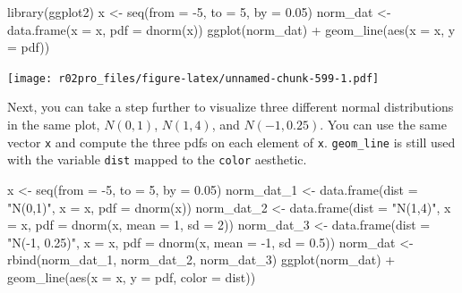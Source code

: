 \documentclass[
]{book}
\newenvironment{Shaded}{\begin{snugshade}}{\end{snugshade}}
\newcommand{\AttributeTok}[1]{\textcolor[rgb]{0.77,0.63,0.00}{#1}}
\newcommand{\DecValTok}[1]{\textcolor[rgb]{0.00,0.00,0.81}{#1}}
\newcommand{\FloatTok}[1]{\textcolor[rgb]{0.00,0.00,0.81}{#1}}
\newcommand{\FunctionTok}[1]{\textcolor[rgb]{0.00,0.00,0.00}{#1}}
\newcommand{\NormalTok}[1]{#1}
\newcommand{\OtherTok}[1]{\textcolor[rgb]{0.56,0.35,0.01}{#1}}
\newcommand{\SpecialCharTok}[1]{\textcolor[rgb]{0.00,0.00,0.00}{#1}}
\newcommand{\StringTok}[1]{\textcolor[rgb]{0.31,0.60,0.02}{#1}}
\begin{document}
\begin{Shaded}
\begin{Highlighting}[]
\FunctionTok{library}\NormalTok{(ggplot2)}
\NormalTok{x }\OtherTok{\textless{}{-}} \FunctionTok{seq}\NormalTok{(}\AttributeTok{from =} \SpecialCharTok{{-}}\DecValTok{5}\NormalTok{, }\AttributeTok{to =} \DecValTok{5}\NormalTok{, }\AttributeTok{by =} \FloatTok{0.05}\NormalTok{)}
\NormalTok{norm\_dat }\OtherTok{\textless{}{-}} \FunctionTok{data.frame}\NormalTok{(}\AttributeTok{x =}\NormalTok{ x, }\AttributeTok{pdf =} \FunctionTok{dnorm}\NormalTok{(x))}
\FunctionTok{ggplot}\NormalTok{(norm\_dat) }\SpecialCharTok{+} \FunctionTok{geom\_line}\NormalTok{(}\FunctionTok{aes}\NormalTok{(}\AttributeTok{x =}\NormalTok{ x, }\AttributeTok{y =}\NormalTok{ pdf))}
\end{Highlighting}
\end{Shaded}

\texttt{[image: r02pro\_files/figure-latex/unnamed-chunk-599-1.pdf]}

Next, you can take a step further to visualize three different normal distributions in the same plot, \(N(0,1)\), \(N(1,4)\), and \(N(-1, 0.25)\). You can use the same vector \texttt{x} and compute the three pdfs on each element of \texttt{x}. \texttt{geom\_line} is still used with the variable \texttt{dist} mapped to the \texttt{color} aesthetic.

\begin{Shaded}
\begin{Highlighting}[]
\NormalTok{x }\OtherTok{\textless{}{-}} \FunctionTok{seq}\NormalTok{(}\AttributeTok{from =} \SpecialCharTok{{-}}\DecValTok{5}\NormalTok{, }\AttributeTok{to =} \DecValTok{5}\NormalTok{, }\AttributeTok{by =} \FloatTok{0.05}\NormalTok{)}
\NormalTok{norm\_dat\_1 }\OtherTok{\textless{}{-}} \FunctionTok{data.frame}\NormalTok{(}\AttributeTok{dist =} \StringTok{"N(0,1)"}\NormalTok{, }\AttributeTok{x =}\NormalTok{ x, }\AttributeTok{pdf =} \FunctionTok{dnorm}\NormalTok{(x))}
\NormalTok{norm\_dat\_2 }\OtherTok{\textless{}{-}} \FunctionTok{data.frame}\NormalTok{(}\AttributeTok{dist =} \StringTok{"N(1,4)"}\NormalTok{, }\AttributeTok{x =}\NormalTok{ x, }\AttributeTok{pdf =} \FunctionTok{dnorm}\NormalTok{(x, }\AttributeTok{mean =} \DecValTok{1}\NormalTok{, }\AttributeTok{sd =} \DecValTok{2}\NormalTok{))}
\NormalTok{norm\_dat\_3 }\OtherTok{\textless{}{-}} \FunctionTok{data.frame}\NormalTok{(}\AttributeTok{dist =} \StringTok{"N({-}1, 0.25)"}\NormalTok{, }\AttributeTok{x =}\NormalTok{ x, }\AttributeTok{pdf =} \FunctionTok{dnorm}\NormalTok{(x, }\AttributeTok{mean =} \SpecialCharTok{{-}}\DecValTok{1}\NormalTok{, }\AttributeTok{sd =} \FloatTok{0.5}\NormalTok{))}
\NormalTok{norm\_dat }\OtherTok{\textless{}{-}} \FunctionTok{rbind}\NormalTok{(norm\_dat\_1, norm\_dat\_2, norm\_dat\_3)}
\FunctionTok{ggplot}\NormalTok{(norm\_dat) }\SpecialCharTok{+} \FunctionTok{geom\_line}\NormalTok{(}\FunctionTok{aes}\NormalTok{(}\AttributeTok{x =}\NormalTok{ x, }\AttributeTok{y =}\NormalTok{ pdf, }\AttributeTok{color =}\NormalTok{ dist))}
\end{Highlighting}
\end{Shaded}
\end{document}
